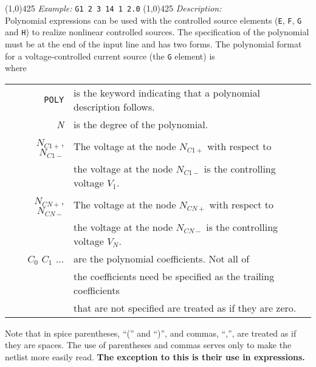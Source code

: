 \newline
\linethickness{0.5mm} \line(1,0){425}
\newline
\textit{Example:}
\newline
\texttt{G1 2 3 14 1 2.0}
\newline
\linethickness{0.5mm} \line(1,0){425}
\newline
\textit{Description:}\\
Polynomial expressions can be used with the controlled source
elements ({\tt E}, {\tt F}, {\tt G} and {\tt H}) to realize
nonlinear controlled sources. The specification of the polynomial
must be at the end of the input line and has two forms. The
polynomial format for a voltage-controlled current source (the
{\tt G} element) is\\[0.1in]
\hspace*{\fill}
\newline
where
\newline
\begin{tabular}{r l}
{\tt POLY} & is the keyword indicating that a polynomial
description follows.\\
{\it N} & is the degree of the polynomial.\\
$N_{C1+}$, $N_{C1-}$ & The voltage at the node $N_{C1+}$ with
respect to\\
& the voltage at the node $N_{C1-}$ is the controlling voltage
$V_1$.\\
$N_{CN+}$, $N_{CN-}$ & The voltage at the node $N_{CN+}$ with
respect to\\
& the voltage at the node $N_{CN-}$ is the controlling voltage
$V_N$.\\
$C_0$ $C_1$ $\ldots$ & are the polynomial coefficients. Not all
of\\
& the coefficients need be specified as the trailing
coefficients\\
& that are not specified are treated as if they are zero.
\end{tabular}

Note that in spice parentheses, ``('' and ``)'', and commas,
``,'', are treated as if they are spaces. The use of parentheses
and commas serves only to make the netlist more easily read. {\bf
The exception to this is their use in expressions.}

